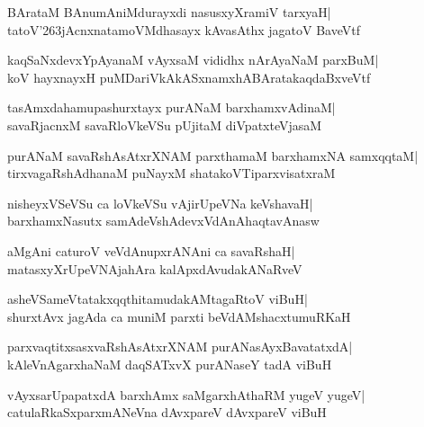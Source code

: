 \documentclass[twoside,12pt,openright]{book}
\def\S{\char'263}
\newcounter{shloka}[chapter]
\begin{document}
\begin{shloka}%
BArataM BAnumAniMdurayxdi nasusxyXramiV tarxyaH|\\
tatoV\S jAcnxnatamoVMdhasayx kAvasAthx jagatoV BaveVtf
\end{shloka}

\begin{shloka}%
kaqSaNxdevxYpAyanaM vAyxsaM vididhx nArAyaNaM parxBuM|\\
koV hayxnayxH puMDariVkAkASxnamxhABAratakaqdaBxveVtf
\end{shloka}

\begin{shloka}%
tasAmxdahamupashurxtayx purANaM barxhamxvAdinaM|\\
savaRjacnxM savaRloVkeVSu pUjitaM diVpatxteVjasaM
\end{shloka}

\begin{shloka}%
purANaM savaRshAsAtxrXNAM parxthamaM barxhamxNA samxqqtaM|\\
tirxvagaRshAdhanaM puNayxM shatakoVTiparxvisatxraM
\end{shloka}

\begin{shloka}%
nisheyxVSeVSu ca loVkeVSu vAjirUpeVNa keVshavaH|\\
barxhamxNasutx samAdeVshAdevxVdAnAhaqtavAnasw
\end{shloka}

\begin{shloka}%
aMgAni caturoV veVdAnupxrANAni ca savaRshaH|\\
matasxyXrUpeVNAjahAra kalApxdAvudakANaRveV
\end{shloka}

\begin{shloka}%
asheVSameVtatakxqqthitamudakAMtagaRtoV viBuH|\\
shurxtAvx jagAda ca muniM parxti beVdAMshacxtumuRKaH
\end{shloka}

\begin{shloka}%
parxvaqtitxsasxvaRshAsAtxrXNAM purANasAyxBavatatxdA|\\
kAleVnAgarxhaNaM daqSATxvX purANaseY tadA viBuH
\end{shloka}

\begin{shloka}%
vAyxsarUpapatxdA barxhAmx saMgarxhAthaRM yugeV yugeV|\\
catulaRkaSxparxmANeVna dAvxpareV dAvxpareV viBuH
\end{shloka}
\end{document}
